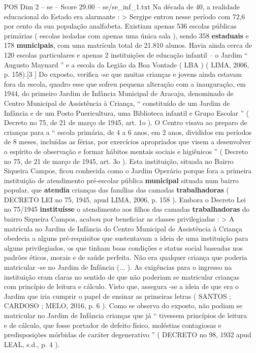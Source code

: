 \begin{textsample}{POS Dim 2 – se – Score 29.00 – se/se\_inf\_1.txt}
Na década de 40, a realidade educacional do Estado era alarmante : > Sergipe entrou nesse período com 72,6 por cento da sua população analfabeta.
Existiam apenas 536 escolas públicas primárias ( escolas isoladas com apenas uma única sala ), sendo 358 \textbf{estaduais} e 178 \textbf{municipais}, com uma matrícula total de 21.810 alunos.
Havia ainda cerca de 120 escolas particulares e apenas 2 instituições de educação infantil – o Jardim “ Augusto Maynard ” e a escola da Legião da Boa Vontade ( LBA ) ( LIMA, 2006, p. 158).[3 ] Do exposto, verifica -se que muitas crianças e jovens ainda estavam fora da escola, quadro esse que sofreu pequena alteração com a inauguração, em 1944, do primeiro Jardim de Infância Municipal de Aracaju, denominado de Centro Municipal de Assistência à Criança, “ constituído de um Jardim de Infância e de um Posto Puericultura, uma Biblioteca infantil e Grupo Escolar ” ( Decreto no 75, de 21 de março de 1945, art. 1o ).
O Centro visava ao preparo de crianças para a “ escola primária, de 4 a 6 anos, em 2 anos, divididos em períodos de 8 meses, incluídas as férias, por exercícios apropriados que visem a desenvolver o espírito de observação e formar hábitos mentais sociais e higiênicos ” ( Decreto no 75, de 21 de março de 1945, art. 3o ).
Esta instituição, situada no Bairro Siqueira Campos, ficou conhecida como o Jardim Operário porque fora a primeira instituição de atendimento pré-escolar pública \textbf{municipal} situada num bairro popular, que \textbf{atendia} crianças das famílias das camadas \textbf{trabalhadoras} ( DECRETO LEI no 75, 1945, apud LIMA, 2006, p. 158 ).
Embora o Decreto Lei no 75/1945 \textbf{instituísse} o atendimento aos filhos das camadas \textbf{trabalhadoras} do bairro Siqueira Campos, acabou por beneficiar as classes privilegiadas : > A matrícula no Jardim de Infância do Centro Municipal de Assistência à Criança obedecia a alguns pré-requisitos que sustentavam a ideia de uma instituição para alguns privilegiados, os que tinham boas condições e status social baseadas nos padrões éticos, morais e de saúde perfeita.
Não era qualquer criança que poderia matricular -se no Jardim de Infância (... ).
As exigências para o ingresso na instituição eram claras no sentido de que não poderiam se matricular crianças com princípio de leitura e cálculo.
Visto que, assegura -se a ideia de que era o Jardim que iria cumprir o papel de ensinar as primeiras letras ( SANTOS ; CARDOSO ; MELO, 2016, p. 6 ).
Como se observa do exposto, não podiam se matricular no Jardim de Infância crianças que já “ tivessem princípios de leitura e de cálculo, que fosse portador de defeito físico, moléstias contagiosas e predisposições mórbidas de caráter degenerativo ” ( DECRETO no 98, 1932 apud LEAL, s.d., p. 4 ).

\end{textsample}
